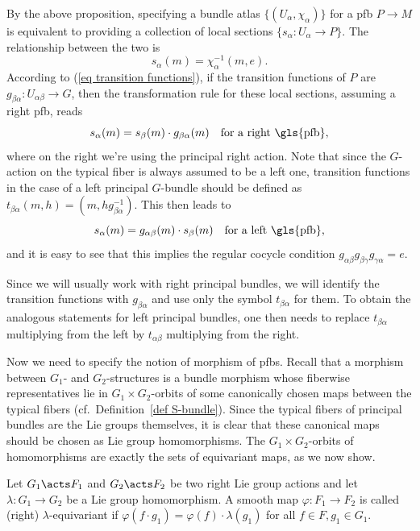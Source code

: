 \begin{rem}
    By the above proposition, specifying a bundle atlas $\{(U_\alpha,\chi_\alpha)\}$ for a \gls{pfb} $P\to M$ is equivalent to providing a collection of local sections $\{s_\alpha:U_\alpha\to P\}$. The relationship between the two is 
    \[s_\alpha(m)=\chi_\alpha^{-1}(m,e).\]
    According to (\ref{eq transition functions}), if the transition functions of $P$ are $g_{\beta\alpha}:U_{\alpha\beta}\to G$, then the transformation rule for these local sections, assuming a right \gls{pfb}, reads 
    \[s_\alpha(m)=s_\beta(m)\cdot g_{\beta\alpha}(m)\quad \text{for a right \gls{pfb}},\label{eq transf rule for sections}\]
    where on the right we're using the principal right action. Note that since the $G$-action on the typical fiber is always assumed to be a left one, transition functions in the case of a left principal $G$-bundle should be defined as $t_{\beta\alpha}(m,h)=(m,hg_{\beta\alpha}^{-1})$. This then leads to 
    \[s_\alpha(m)=g_{\alpha\beta}(m) \cdot s_\beta(m) \quad \text{for a left \gls{pfb}},\]
    and it is easy to see that this implies the regular cocycle condition $g_{\alpha\beta}g_{\beta\gamma}g_{\gamma\alpha}=e$.

    Since we will usually work with right principal bundles, we will identify the transition functions with $g_{\beta\alpha}$ and use only the symbol $t_{\beta\alpha}$ for them. To obtain the analogous statements for left principal bundles, one then needs to replace $t_{\beta\alpha}$ multiplying from the left by $t_{\alpha\beta}$ multiplying from the right.
\end{rem}

Now we need to specify the notion of morphism of \glspl{pfb}. Recall that a morphism between $G_1$- and $G_2$-structures is a bundle morphism whose fiberwise representatives lie in $G_1\times G_2$-orbits of some canonically chosen maps between the typical fibers (cf.\ Definition~\ref{def S-bundle}). Since the typical fibers of principal bundles are the Lie groups themselves, it is clear that these canonical maps should be chosen as Lie group homomorphisms. The $G_1\times G_2$-orbits of homomorphisms are exactly the sets of equivariant maps, as we now show. 

\begin{defn}
    Let $G_1\acts F_1$ and $G_2\acts F_2$ be two right Lie group actions and let $\lambda:G_1\to G_2$ be a Lie group homomorphism. A smooth map $\varphi:F_1\to F_2$ is called (right) $\lambda$-equivariant if $\varphi(f\cdot g_1)=\varphi(f)\cdot \lambda(g_1)$ for all $f\in F,g_1\in G_1$.
\end{defn}

